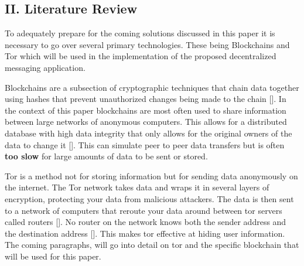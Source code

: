 \documentclass{article}
\begin{document}
\begin{center}
	\section*{II. Literature Review}
\end{center}

To adequately prepare for the coming solutions discussed in this paper it is necessary to go over several primary technologies. 
These being Blockchains and Tor which will be used in the implementation of the proposed decentralized messaging application. 

Blockchains are a subsection of cryptographic techniques that chain data together using hashes that prevent unauthorized changes being made to the chain []. 
In the context of this paper blockchains are most often used to share information between large networks of anonymous computers. 
This allows for a distributed database with high data integrity that only allows for the original owners of the data to change it []. 
This can simulate peer to peer data transfers but is often \textbf{too slow} for large amounts of data to be sent or stored.

Tor is a method not for storing information but for sending data anonymously on the internet. 
The Tor network takes data and wraps it in several layers of encryption, protecting your data from malicious attackers. %
The data is then sent to a network of computers that reroute your data around between tor servers called routers []. 
No router on the network knows both the sender address and the destination address []. 
This makes tor effective at hiding user information. 
The coming paragraphs, will go into detail on tor and the specific blockchain that will be used for this paper.
\end{document}
